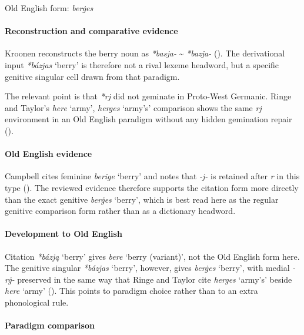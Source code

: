 \documentclass[
  british,
  a4paper,
]{article}
\providecommand{\Recon}[1]{\emph{*#1}}
\begin{document}
Old English form: \emph{berġes}

\paragraph{Reconstruction and comparative
evidence}\label{reconstruction-and-comparative-evidence-125}

Kroonen reconstructs the berry noun as {\emph{*basja-}}
\textasciitilde{} {\emph{*bazja-}} (). The derivational input \Recon{bázjas} `berry' is therefore
not a rival lexeme headword, but a specific genitive singular cell drawn
from that paradigm.

The relevant point is that \emph{*rj} did not geminate in Proto-West
Germanic. Ringe and Taylor's {\emph{here}} `army', {\emph{herges}}
`army's' comparison shows the same \emph{rj} environment in an Old
English paradigm without any hidden gemination repair
().

\paragraph{Old English evidence}\label{old-english-evidence-127}

Campbell cites feminine {\emph{berige}} `berry' and notes that
\emph{-j-} is retained after \emph{r} in this type
(). The reviewed evidence
therefore supports the citation form more directly than the exact
genitive {\emph{berġes}} `berry', which is best read here as the regular
genitive comparison form rather than as a dictionary headword.

\paragraph{Development to Old
English}\label{development-to-old-english-125}

Citation \Recon{bázją} `berry' gives {\emph{bere}} `berry (variant)',
not the Old English form here. The genitive singular \Recon{bázjas}
`berry', however, gives {\emph{berġes}} `berry', with medial \emph{-rġ-}
preserved in the same way that Ringe and Taylor cite {\emph{herges}}
`army's' beside {\emph{here}} `army'
(). This
points to paradigm choice rather than to an extra phonological rule.

\paragraph{Paradigm comparison}\label{paradigm-comparison-2}
\end{document}
